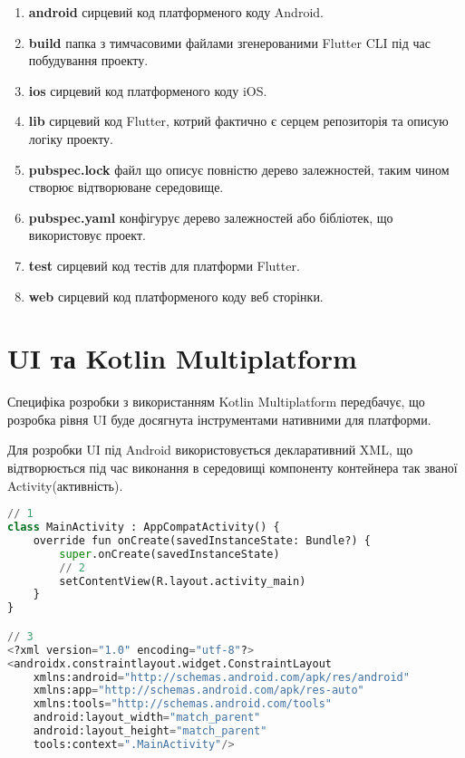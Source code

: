 \begin{enumerate}
    \item \textbf{android} сирцевий код платформеного коду Android.
    \item \textbf{build} папка з тимчасовими файлами згенерованими Flutter CLI під час побудування проекту.
    \item \textbf{ios} сирцевий код платформеного коду iOS.
    \item \textbf{lib} сирцевий код Flutter, котрий фактично є серцем репозиторія та описую логіку проекту.
    \item \textbf{pubspec.lock} файл що описує повністю дерево залежностей, таким чином створює відтворюване середовище.
    \item \textbf{pubspec.yaml} конфігурує дерево залежностей або бібліотек, що використовує проект.
    \item \textbf{test} сирцевий код тестів для платформи Flutter.
    \item \textbf{web} сирцевий код платформеного коду веб сторінки.
\end{enumerate}


\section{UI та Kotlin Multiplatform}
\label{section.2.8}
Специфіка розробки з використанням Kotlin Multiplatform передбачує, що розробка рівня UI буде досягнута
інструментами нативними для платформи.

Для розробки UI під Android використовується декларативний XML, що відтворюється під час виконання в середовищі компоненту
контейнера так званої Activity(активність).
\begin{lstlisting}[style=light, language=Python,label={lst:android_xml},caption=Android UI with XML]
// 1
class MainActivity : AppCompatActivity() {
    override fun onCreate(savedInstanceState: Bundle?) {
        super.onCreate(savedInstanceState)
        // 2
        setContentView(R.layout.activity_main)
    }
}

// 3
<?xml version="1.0" encoding="utf-8"?>
<androidx.constraintlayout.widget.ConstraintLayout
    xmlns:android="http://schemas.android.com/apk/res/android"
    xmlns:app="http://schemas.android.com/apk/res-auto"
    xmlns:tools="http://schemas.android.com/tools"
    android:layout_width="match_parent"
    android:layout_height="match_parent"
    tools:context=".MainActivity"/>
\end{lstlisting}

